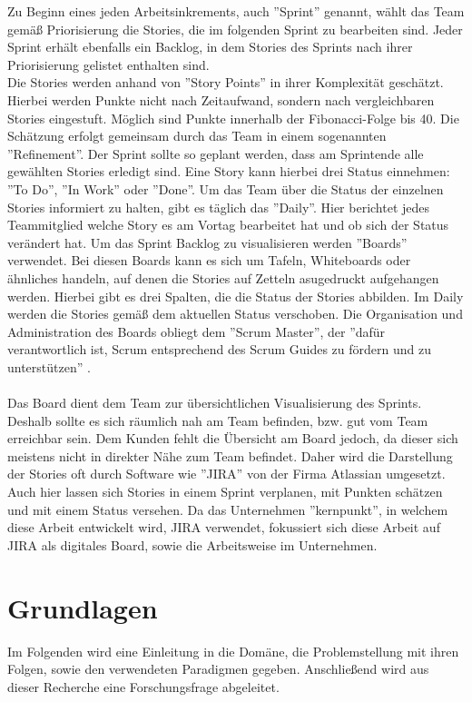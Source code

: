 \documentclass[12pt,titlepage]{scrartcl}
\begin{document}
		Zu Beginn eines jeden Arbeitsinkrements, auch ''Sprint'' genannt, wählt das Team gemäß Priorisierung die Stories, die im folgenden Sprint zu bearbeiten sind. Jeder Sprint erhält ebenfalls ein Backlog, in dem Stories des Sprints nach ihrer Priorisierung gelistet enthalten sind. \\ 
		Die Stories werden anhand von ''Story Points'' in ihrer Komplexität geschätzt. Hierbei werden Punkte nicht nach Zeitaufwand, sondern nach vergleichbaren Stories eingestuft. Möglich sind Punkte innerhalb der Fibonacci-Folge bis 40. Die Schätzung erfolgt gemeinsam durch das Team in einem sogenannten ''Refinement''. Der Sprint sollte so geplant werden, dass am Sprintende alle gewählten Stories erledigt sind. Eine Story kann hierbei drei Status einnehmen: ''To Do'', ''In Work'' oder ''Done''. Um das Team über die Status der einzelnen Stories informiert zu halten, gibt es täglich das ''Daily''. Hier berichtet jedes Teammitglied welche Story es am Vortag bearbeitet hat und ob sich der Status verändert hat. Um das Sprint Backlog zu visualisieren werden ''Boards'' verwendet. Bei diesen Boards kann es sich um Tafeln, Whiteboards oder ähnliches handeln, auf denen die Stories auf Zetteln asugedruckt aufgehangen werden. Hierbei gibt es drei Spalten, die die Status der Stories abbilden. Im Daily werden die Stories gemäß dem aktuellen Status verschoben. Die Organisation und Administration des Boards obliegt dem ''Scrum Master'', der ''dafür verantwortlich ist, Scrum entsprechend des Scrum Guides zu fördern und zu unterstützen'' \cite{guide}. \\ \\
		Das Board dient dem Team zur übersichtlichen Visualisierung des Sprints. Deshalb sollte es sich räumlich nah am Team befinden, bzw. gut vom Team erreichbar sein. Dem Kunden fehlt die Übersicht am Board jedoch, da dieser sich meistens nicht in direkter Nähe zum Team befindet. Daher wird die Darstellung der Stories oft durch Software wie ''JIRA'' von der Firma Atlassian umgesetzt. Auch hier lassen sich Stories in einem Sprint verplanen, mit Punkten schätzen und mit einem Status versehen. Da das Unternehmen ''kernpunkt'', in welchem diese Arbeit entwickelt wird, JIRA verwendet, fokussiert sich diese Arbeit auf JIRA als digitales Board, sowie die Arbeitsweise im Unternehmen.
		\newpage
		\section{Grundlagen}
	Im Folgenden wird eine Einleitung in die Domäne, die Problemstellung mit ihren Folgen, sowie den verwendeten Paradigmen gegeben. Anschließend wird aus dieser Recherche eine Forschungsfrage abgeleitet.
\end{document}
